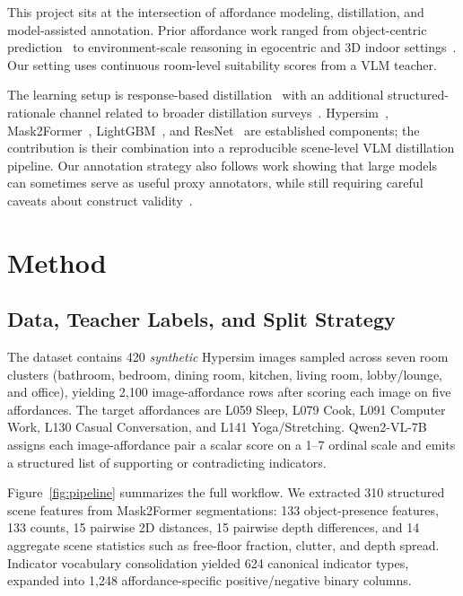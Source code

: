 \documentclass[10pt,twocolumn]{article}
\newcommand{\figref}[1]{Figure~\ref{#1}}
\begin{document}
This project sits at the intersection of affordance modeling, distillation, and
model-assisted annotation. Prior affordance work ranged from object-centric
prediction~\cite{Do2018AffordanceNet,Chuang2018} to environment-scale reasoning
in egocentric and 3D indoor settings~\cite{Nagarajan2020,Li2019PuttingHumans}.
Our setting uses continuous room-level suitability scores from a VLM teacher.

The learning setup is response-based distillation~\cite{Hinton2015} with an
additional structured-rationale channel related to broader distillation
surveys~\cite{Gou2021}. Hypersim~\cite{Roberts2021}, Mask2Former~\cite{Cheng2022},
LightGBM~\cite{Ke2017}, and ResNet~\cite{He2016} are established components; the
contribution is their combination into a reproducible scene-level VLM
distillation pipeline. Our annotation strategy also follows work showing that
large models can sometimes serve as useful proxy annotators, while still
requiring careful caveats about construct validity~\cite{Gilardi2023}.

\section{Method}
\label{sec:method}

\subsection{Data, Teacher Labels, and Split Strategy}

The dataset contains 420 \emph{synthetic} Hypersim images sampled across seven
room clusters (bathroom, bedroom, dining room, kitchen, living room,
lobby/lounge, and office), yielding 2,100 image-affordance rows after scoring
each image on five affordances. The target affordances are L059 Sleep, L079
Cook, L091 Computer Work, L130 Casual Conversation, and L141
Yoga/Stretching. Qwen2-VL-7B assigns each image-affordance pair a scalar score
on a 1--7 ordinal scale and emits a structured list of supporting or
contradicting indicators.

\figref{fig:pipeline} summarizes the full workflow. We extracted 310 structured
scene features from Mask2Former segmentations: 133 object-presence features, 133
counts, 15 pairwise 2D distances, 15 pairwise depth differences, and 14
aggregate scene statistics such as free-floor fraction, clutter, and depth
spread. Indicator vocabulary consolidation yielded 624 canonical indicator
types, expanded into 1,248 affordance-specific positive/negative binary columns.
\end{document}
